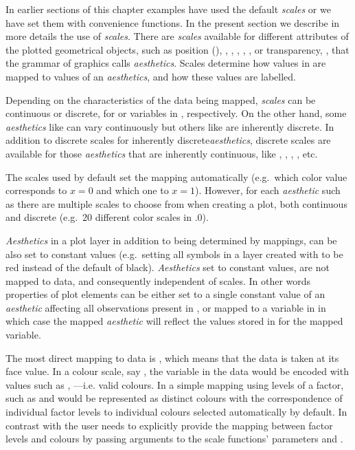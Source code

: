 \documentclass[krantz2]{krantz}\usepackage{knitr}%
\begin{document}
In earlier sections of this chapter examples have used the default \emph{scales} or we have set them with convenience functions. In the present section we describe in more details the use of \emph{scales}. There are \emph{scales} available for different attributes of the plotted geometrical objects, such as position (), , , , , ,  or transparency, , that the grammar of graphics calls \emph{aesthetics}. Scales determine how values in  are mapped to values of an \emph{aesthetics}, and how these values are labelled.

Depending on the characteristics of the data being mapped, \emph{scales} can be continuous or discrete, for  or  variables in , respectively. On the other hand, some \emph{aesthetics} like  can vary continuously but others like  are inherently discrete. In addition to discrete scales for inherently discrete\emph{aesthetics}, discrete scales are available for those \emph{aesthetics} that are inherently continuous, like , , , , etc.\

The scales used by default set the mapping automatically (e.g.\ which color value corresponds to $x = 0$ and which one to $x = 1$). However, for each \emph{aesthetic} such as  there are multiple scales to choose from when creating a plot, both continuous and discrete (e.g.\ 20 different color scales in .0).

\begin{explainbox}
\emph{Aesthetics} in a plot layer in addition to being determined by mappings, can be also set to constant values (e.g.\ setting all symbols in a layer created with  to be red instead of the default of black). \emph{Aesthetics} set to constant values, are not mapped to data, and consequently independent of scales. In other words properties of plot elements can be either set to a single constant value of an \emph{aesthetic} affecting all observations present in , or mapped to a variable in  in which case the mapped \emph{aesthetic} will reflect the values stored in  for the mapped variable.
\end{explainbox}

The most direct mapping to data is , which means that the data is taken at its face value. In a colour scale, say , the variable in the data would be encoded with values such as , ---i.e. valid \Rlang colours. In a simple mapping using  levels of a factor, such as  and  would be represented as distinct colours with the correspondence of individual factor levels to individual colours selected automatically by default. In contrast with  the user needs to explicitly provide the mapping between factor levels and colours by passing arguments to the scale functions' parameters  and .
\end{document}

